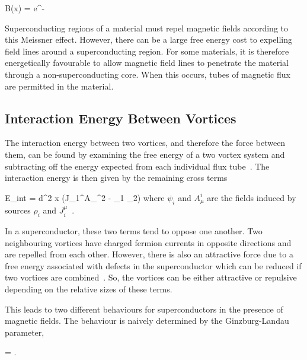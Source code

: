 \be
	B(x) = e^{-}
\ee


Superconducting regions of a material must repel magnetic 
fields according to this Meissner effect. However, there 
can be a large free energy cost to expelling field lines 
around a superconducting region. For some materials, it 
is therefore energetically favourable to allow magnetic field 
lines to penetrate the material through a non-superconducting 
core. When this occurs, tubes of magnetic flux are 
permitted in the material.

\subsection{Interaction Energy Between Vortices}


The interaction energy between two vortices, and therefore 
the force between them, can be found by examining the 
free energy of a two vortex system and subtracting off 
the energy expected from each individual flux tube~\cite{PhysRevB.3.3821}.
The interaction energy is then given by the remaining cross terms

\be
	E_{\rm int} = \int d^2 x \left(J_1^\mu A_\mu^2 - \rho_1 \psi_2\right)
\ee
where $\psi_i$ and $A_\mu^i$ are the fields induced by sources 
$\rho_i$ and $J_i^\mu$~\cite{Speight_staticintervortex}.

In a superconductor, these two terms tend to oppose one 
another. Two neighbouring vortices 
have charged fermion currents in opposite directions 
and are repelled from each other. However, there 
is also an attractive force due to a free energy associated 
with defects in the superconductor which can be reduced 
if two vortices are combined~\cite{PhysRevB.3.3821}. 
So, the vortices can be 
either attractive or repulsive depending on the relative 
sizes of these terms.


This leads to two different behaviours for superconductors 
in the presence of magnetic fields. The behaviour is 
naively determined by the Ginzburg-Landau parameter,

\be
	\label{eqn:GLparam}
	\kappa = .
\ee

